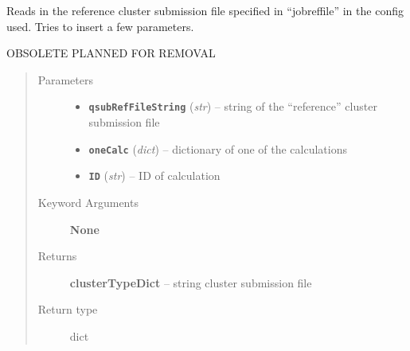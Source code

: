 \documentclass[letterpaper,10pt,english]{sphinxmanual}
\begin{document}
\begin{fulllineitems}
\label{run:run.generateSubRef}
Reads in the reference cluster submission file specified in ``jobreffile''
in the config used. Tries to insert a few parameters.

OBSOLETE PLANNED FOR REMOVAL
\begin{quote}\begin{description}
\item[{Parameters}] \leavevmode\begin{itemize}
\item {} 
\textbf{\texttt{qsubRefFileString}} (\emph{str}) -- string of the ``reference'' cluster submission file

\item {} 
\textbf{\texttt{oneCalc}} (\emph{dict}) -- dictionary of one of the calculations

\item {} 
\textbf{\texttt{ID}} (\emph{str}) -- ID of calculation

\end{itemize}

\item[{Keyword Arguments}] \leavevmode
\textbf{None}

\item[{Returns}] \leavevmode
\textbf{clusterTypeDict} --
string cluster submission file

\item[{Return type}] \leavevmode
dict

\end{description}\end{quote}

\end{fulllineitems}

\end{document}
